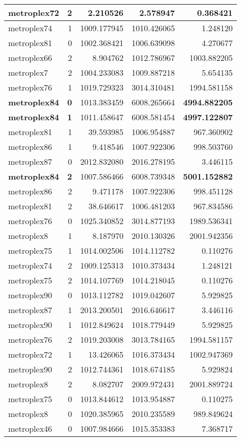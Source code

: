 \documentclass[../../../thesis.tex]{subfiles}
\begin{document}
\begin{longtable}{|l|r|r|r|r|}
metroplex72 & 2 & 2.210526 & 2.578947 & 0.368421 \\\hline
metroplex74 & 1 & 1009.177945 & 1010.426065 & 1.248120 \\\hline
metroplex81 & 0 & 1002.368421 & 1006.639098 & 4.270677 \\\hline
metroplex66 & 2 & 8.904762 & 1012.786967 & 1003.882205 \\\hline
metroplex7 & 2 & 1004.233083 & 1009.887218 & 5.654135 \\\hline
metroplex76 & 1 & 1019.729323 & 3014.310481 & 1994.581158 \\\hline
\textbf{metroplex84} & \textbf{0} & 1013.383459 & 6008.265664 & \textbf{4994.882205} \\\hline
\textbf{metroplex84} & \textbf{1} & 1011.458647 & 6008.581454 & \textbf{4997.122807} \\\hline
metroplex81 & 1 & 39.593985 & 1006.954887 & 967.360902 \\\hline
metroplex86 & 1 & 9.418546 & 1007.922306 & 998.503760 \\\hline
metroplex87 & 0 & 2012.832080 & 2016.278195 & 3.446115 \\\hline
\textbf{metroplex84} & \textbf{2} & 1007.586466 & 6008.739348 & \textbf{5001.152882} \\\hline
metroplex86 & 2 & 9.471178 & 1007.922306 & 998.451128 \\\hline
metroplex81 & 2 & 38.646617 & 1006.481203 & 967.834586 \\\hline
metroplex76 & 0 & 1025.340852 & 3014.877193 & 1989.536341 \\\hline
metroplex8 & 1 & 8.187970 & 2010.130326 & 2001.942356 \\\hline
metroplex75 & 1 & 1014.002506 & 1014.112782 & 0.110276 \\\hline
metroplex74 & 2 & 1009.125313 & 1010.373434 & 1.248121 \\\hline
metroplex75 & 2 & 1014.107769 & 1014.218045 & 0.110276 \\\hline
metroplex90 & 0 & 1013.112782 & 1019.042607 & 5.929825 \\\hline
metroplex87 & 1 & 2013.200501 & 2016.646617 & 3.446116 \\\hline
metroplex90 & 1 & 1012.849624 & 1018.779449 & 5.929825 \\\hline
metroplex76 & 2 & 1019.203008 & 3013.784165 & 1994.581157 \\\hline
metroplex72 & 1 & 13.426065 & 1016.373434 & 1002.947369 \\\hline
metroplex90 & 2 & 1012.744361 & 1018.674185 & 5.929824 \\\hline
metroplex8 & 2 & 8.082707 & 2009.972431 & 2001.889724 \\\hline
metroplex75 & 0 & 1013.844612 & 1013.954887 & 0.110275 \\\hline
metroplex8 & 0 & 1020.385965 & 2010.235589 & 989.849624 \\\hline
metroplex46 & 0 & 1007.984666 & 1015.353383 & 7.368717 \\\hline
\end{longtable}
\end{document}
